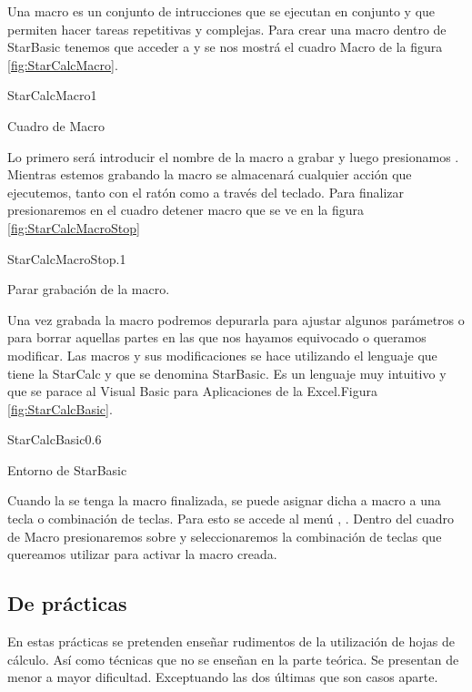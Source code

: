 Una macro es un conjunto de intrucciones que se ejecutan en conjunto y que
permiten hacer tareas repetitivas y complejas.
Para crear una macro dentro de StarBasic tenemos que acceder a
 y  se nos mostrá el cuadro Macro de la
figura \ref{fig:StarCalcMacro}.

\begin{figura}{StarCalcMacro}{1}
\caption{Cuadro de Macro}
\label{fig:StarCalcMacro}
\end{figura}


Lo primero será introducir el nombre de la macro a grabar y luego presionamos
. Mientras estemos grabando la macro se almacenará cualquier
acción que ejecutemos, tanto con el ratón como a través del teclado. Para
finalizar presionaremos en el cuadro detener macro que se ve en la figura
\ref{fig:StarCalcMacroStop}

\begin{figura}{StarCalcMacroStop}{.1}
\caption{Parar grabación de la macro.}
\label{fig:StarCalcMacroStop}
\end{figura}


Una vez grabada la macro podremos depurarla para ajustar algunos parámetros
o para borrar aquellas partes en las que nos hayamos equivocado o queramos
modificar.
Las macros y sus modificaciones se hace utilizando el lenguaje que tiene
la StarCalc y que se denomina StarBasic. Es un lenguaje muy intuitivo y
que se parace al Visual Basic para Aplicaciones de la Excel.Figura
\ref{fig:StarCalcBasic}.

\begin{figura}{StarCalcBasic}{0.6}
\caption{Entorno de StarBasic}
\label{fig:StarCalcBasic}
\end{figura}


Cuando la se tenga la macro finalizada, se puede asignar dicha a macro a una
tecla o combinación de teclas. Para esto se accede al menú ,
. Dentro del cuadro de Macro presionaremos sobre
 y seleccionaremos la combinación de teclas que quereamos
utilizar para activar la macro creada.

\subsection{De prácticas} 
En estas prácticas se pretenden enseñar rudimentos de la utilización 
de hojas de cálculo. Así como técnicas que no se enseñan en la parte 
teórica. 
Se presentan de menor a mayor dificultad. Exceptuando las dos últimas 
que son casos aparte.
 

